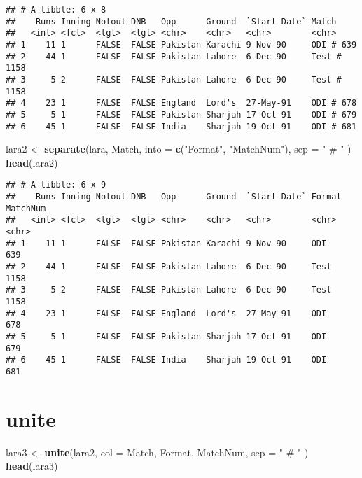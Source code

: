 \documentclass[]{book}
\newenvironment{Shaded}{\begin{snugshade}}{\end{snugshade}}
\newcommand{\DataTypeTok}[1]{\textcolor[rgb]{0.13,0.29,0.53}{#1}}
\newcommand{\KeywordTok}[1]{\textcolor[rgb]{0.13,0.29,0.53}{\textbf{#1}}}
\newcommand{\NormalTok}[1]{#1}
\newcommand{\StringTok}[1]{\textcolor[rgb]{0.31,0.60,0.02}{#1}}
\begin{document}
\begin{verbatim}
## # A tibble: 6 x 8
##    Runs Inning Notout DNB   Opp      Ground  `Start Date` Match      
##   <int> <fct>  <lgl>  <lgl> <chr>    <chr>   <chr>        <chr>      
## 1    11 1      FALSE  FALSE Pakistan Karachi 9-Nov-90     ODI # 639  
## 2    44 1      FALSE  FALSE Pakistan Lahore  6-Dec-90     Test # 1158
## 3     5 2      FALSE  FALSE Pakistan Lahore  6-Dec-90     Test # 1158
## 4    23 1      FALSE  FALSE England  Lord's  27-May-91    ODI # 678  
## 5     5 1      FALSE  FALSE Pakistan Sharjah 17-Oct-91    ODI # 679  
## 6    45 1      FALSE  FALSE India    Sharjah 19-Oct-91    ODI # 681
\end{verbatim}

\begin{Shaded}
\begin{Highlighting}[]
\NormalTok{lara2 <-}\StringTok{ }\KeywordTok{separate}\NormalTok{(lara, Match, }\DataTypeTok{into =} \KeywordTok{c}\NormalTok{(}\StringTok{"Format"}\NormalTok{, }\StringTok{"MatchNum"}\NormalTok{), }\DataTypeTok{sep =} \StringTok{" # "}\NormalTok{ )}
\KeywordTok{head}\NormalTok{(lara2)}
\end{Highlighting}
\end{Shaded}

\begin{verbatim}
## # A tibble: 6 x 9
##    Runs Inning Notout DNB   Opp      Ground  `Start Date` Format MatchNum
##   <int> <fct>  <lgl>  <lgl> <chr>    <chr>   <chr>        <chr>  <chr>   
## 1    11 1      FALSE  FALSE Pakistan Karachi 9-Nov-90     ODI    639     
## 2    44 1      FALSE  FALSE Pakistan Lahore  6-Dec-90     Test   1158    
## 3     5 2      FALSE  FALSE Pakistan Lahore  6-Dec-90     Test   1158    
## 4    23 1      FALSE  FALSE England  Lord's  27-May-91    ODI    678     
## 5     5 1      FALSE  FALSE Pakistan Sharjah 17-Oct-91    ODI    679     
## 6    45 1      FALSE  FALSE India    Sharjah 19-Oct-91    ODI    681
\end{verbatim}

\hypertarget{unite}{%
\section*{\texorpdfstring{\textbf{unite}}{unite}}\label{unite}}

\begin{Shaded}
\begin{Highlighting}[]
\NormalTok{lara3 <-}\StringTok{ }\KeywordTok{unite}\NormalTok{(lara2, }\DataTypeTok{col =}\NormalTok{ Match, Format, MatchNum, }\DataTypeTok{sep =} \StringTok{" # "}\NormalTok{ )}
\KeywordTok{head}\NormalTok{(lara3)}
\end{Highlighting}
\end{Shaded}
\end{document}
